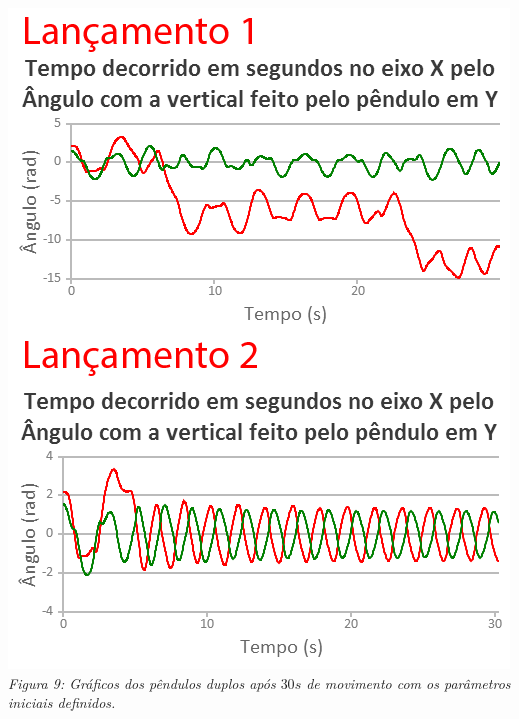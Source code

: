 \documentclass[13pt,a4paper]{report}
\begin{document}
\begin{center}
\includegraphics[scale=0.9]{figuras/figura9.png}
\\
\textit{Figura 9: Gráficos dos pêndulos duplos após $30 s$ de movimento com os parâmetros iniciais definidos.}
\end{center}
\clearpage
\end{document}
